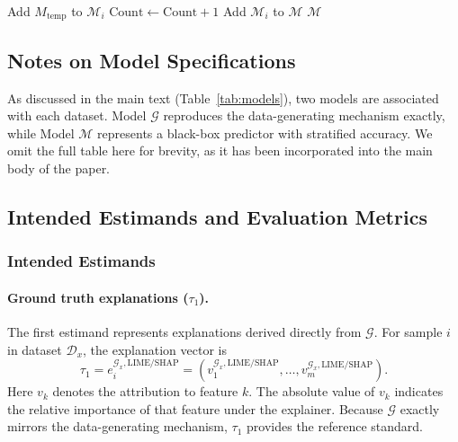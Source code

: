 \documentclass[mnsc,blindrev]{informs3}
\begin{document}
\begin{algorithm}[H]
\ContinuedFloat
\caption*{Construct All Models $\mathcal{M}$ (Continued)}
\begin{algorithmic}[1]

                \State Add $M_\text{temp}$ to $\mathcal{M}_i$
                \State $\text{Count} \gets \text{Count}+1$
            \EndIf
        \EndWhile
    \EndFor
    \State Add $\mathcal{M}_i$ to $\mathcal{M}$
\EndFor
\State \Return $\mathcal{M}$
\end{algorithmic}
\end{algorithm}


\subsection{Notes on Model Specifications}
\label{app:constuction_models}

As discussed in the main text (Table~\ref{tab:models}), two models are associated with each dataset. Model $\mathcal{G}$ reproduces the data-generating mechanism exactly, while Model $\mathcal{M}$ represents a black-box predictor with stratified accuracy. We omit the full table here for brevity, as it has been incorporated into the main body of the paper.


\subsection{Intended Estimands and Evaluation Metrics}
\label{app:intended_estimands_and_metrics}

\subsubsection{Intended Estimands}

\paragraph{Ground truth explanations ($\tau_1$).}
\label{app:intend_estimand_1}
The first estimand represents explanations derived directly from $\mathcal{G}$. For sample $i$ in dataset $\mathcal{D}_x$, the explanation vector is
\begin{equation}
    \tau_1 = e_{i}^{\mathcal{G}_x,\text{LIME/SHAP}} = (v_{1}^{\mathcal{G}_x,\text{LIME/SHAP}}, \ldots, v_{m}^{\mathcal{G}_x,\text{LIME/SHAP}}).
\end{equation}
Here $v_k$ denotes the attribution to feature $k$. The absolute value of $v_k$ indicates the relative importance of that feature under the explainer. Because $\mathcal{G}$ exactly mirrors the data-generating mechanism, $\tau_1$ provides the reference standard.
\end{document}
